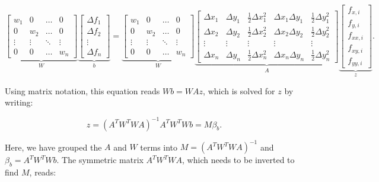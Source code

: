 \documentclass{article}
\begin{document}
\begin{equation} \label{eq:disc_LSmatrix}
\underbrace{\begin{bmatrix}
w_1 & 0 & \ldots & 0 \\ 0 & w_2 & \ldots & 0 \\ \vdots & \vdots & \ddots & \vdots \\ 0 & 0 & \ldots & w_n
 \end{bmatrix}}_W
\underbrace{\begin{bmatrix}
\Delta f_1 \\ \Delta f_2 \\ \vdots \\ \Delta f_n
 \end{bmatrix}}_b
 =
\underbrace{\begin{bmatrix}
w_1 & 0 & \ldots & 0 \\ 0 & w_2 & \ldots & 0 \\ \vdots & \vdots & \ddots & \vdots \\ 0 & 0 & \ldots & w_n
 \end{bmatrix}}_W
\underbrace{\begin{bmatrix}
\Delta x_1 & \Delta y_1 & \frac{1}{2} \Delta x_1^2 & \Delta x_1 \Delta y_1 & \frac{1}{2} \Delta y_1^2 \\
\Delta x_2 & \Delta y_2 & \frac{1}{2} \Delta x_2^2 & \Delta x_2 \Delta y_2 & \frac{1}{2} \Delta y_2^2 \\
\vdots & \vdots & \vdots & \vdots & \vdots \\
\Delta x_n & \Delta y_n & \frac{1}{2} \Delta x_n^2 & \Delta x_n \Delta y_n & \frac{1}{2} \Delta y_n^2
 \end{bmatrix}}_A
\underbrace{\begin{bmatrix}
f_{x,i} \\ f_{y,i} \\ f_{xx,i} \\ f_{xy,i} \\ f_{yy,i} 
 \end{bmatrix}}_z.
\end{equation}

Using matrix notation, this equation reads $Wb = WAz$, which is solved for $z$ by writing:

\begin{equation} \label{eq:disc_LSmatrix2}
z = {\left( A^T W^T W A \right)}^{-1} A^T W^T W b = M \beta_b.
\end{equation}

Here, we have grouped the $A$ and $W$ terms into $M = {\left( A^T W^T W A \right)}^{-1}$ and $\beta_b = A^T W^T W b$. The symmetric matrix $A^T W^T W A$, which needs to be inverted to find $M$, reads:
\end{document}
